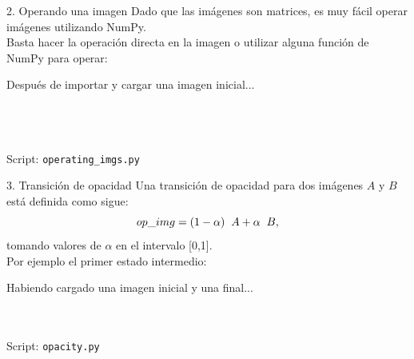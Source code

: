 \documentclass[usenames,dvipsnames]{beamer}
\begin{document}
  \begin{frame}{2. Operando una imagen}
    Dado que las imágenes son matrices, es muy fácil operar imágenes utilizando
    NumPy.\\
    \vspace*{0.3cm}
    Basta hacer la operación directa en la imagen o utilizar alguna función de
    NumPy para operar:
    \vspace*{0.3cm}
    \begin{block}{Después de importar y cargar una imagen inicial...}
      \\
      \\
      \\
      \\
      \vspace*{0.5cm}
    \end{block}
    Script: \texttt{operating\_imgs.py}
  \end{frame}

  \begin{frame}{3. Transición de opacidad}
    Una transición de opacidad para dos imágenes $A$ y $B$ está definida como
    sigue:
    $$op\_img = (1 - \alpha) \hspace*{0.2cm} A + \alpha \hspace*{0.2cm} B,$$
    tomando valores de $\alpha$ en el intervalo [0,1].\\
    \vspace*{0.3cm}
    Por ejemplo el primer estado intermedio:
    \vspace*{0.3cm}
    \begin{block}{Habiendo cargado una imagen inicial y una final...}
      \\
      \\
      \\
      \vspace*{0.5cm}
    \end{block}
    Script: \texttt{opacity.py}
  \end{frame}
\end{document}
